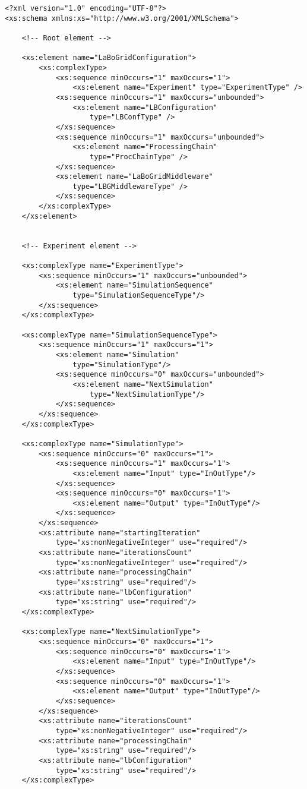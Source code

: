 \begin{Verbatim}[tabsize=2,frame=lines]
<?xml version="1.0" encoding="UTF-8"?>
<xs:schema xmlns:xs="http://www.w3.org/2001/XMLSchema">

	<!-- Root element -->

	<xs:element name="LaBoGridConfiguration">
		<xs:complexType>
			<xs:sequence minOccurs="1" maxOccurs="1">
				<xs:element name="Experiment" type="ExperimentType" />
			<xs:sequence minOccurs="1" maxOccurs="unbounded">
				<xs:element name="LBConfiguration"
					type="LBConfType" />
			</xs:sequence>
			<xs:sequence minOccurs="1" maxOccurs="unbounded">
				<xs:element name="ProcessingChain"
					type="ProcChainType" />
			</xs:sequence>
			<xs:element name="LaBoGridMiddleware"
				type="LBGMiddlewareType" />
			</xs:sequence>
		</xs:complexType>
	</xs:element>
	
	
	<!-- Experiment element -->
	
	<xs:complexType name="ExperimentType">
		<xs:sequence minOccurs="1" maxOccurs="unbounded">
			<xs:element name="SimulationSequence"
				type="SimulationSequenceType"/>
		</xs:sequence>
	</xs:complexType>
	
	<xs:complexType name="SimulationSequenceType">
		<xs:sequence minOccurs="1" maxOccurs="1">
			<xs:element name="Simulation"
				type="SimulationType"/>
			<xs:sequence minOccurs="0" maxOccurs="unbounded">
				<xs:element name="NextSimulation"
					type="NextSimulationType"/>
			</xs:sequence>
		</xs:sequence>
	</xs:complexType>
	
	<xs:complexType name="SimulationType">
		<xs:sequence minOccurs="0" maxOccurs="1">
			<xs:sequence minOccurs="1" maxOccurs="1">
				<xs:element name="Input" type="InOutType"/>
			</xs:sequence>
			<xs:sequence minOccurs="0" maxOccurs="1">
				<xs:element name="Output" type="InOutType"/>
			</xs:sequence>
		</xs:sequence>
		<xs:attribute name="startingIteration"
			type="xs:nonNegativeInteger" use="required"/>
		<xs:attribute name="iterationsCount"
			type="xs:nonNegativeInteger" use="required"/>
		<xs:attribute name="processingChain"
			type="xs:string" use="required"/>
		<xs:attribute name="lbConfiguration"
			type="xs:string" use="required"/>
	</xs:complexType>
	
	<xs:complexType name="NextSimulationType">
		<xs:sequence minOccurs="0" maxOccurs="1">
			<xs:sequence minOccurs="0" maxOccurs="1">
				<xs:element name="Input" type="InOutType"/>
			</xs:sequence>
			<xs:sequence minOccurs="0" maxOccurs="1">
				<xs:element name="Output" type="InOutType"/>
			</xs:sequence>
		</xs:sequence>
		<xs:attribute name="iterationsCount"
			type="xs:nonNegativeInteger" use="required"/>
		<xs:attribute name="processingChain"
			type="xs:string" use="required"/>
		<xs:attribute name="lbConfiguration"
			type="xs:string" use="required"/>
	</xs:complexType>


\end{Verbatim}

